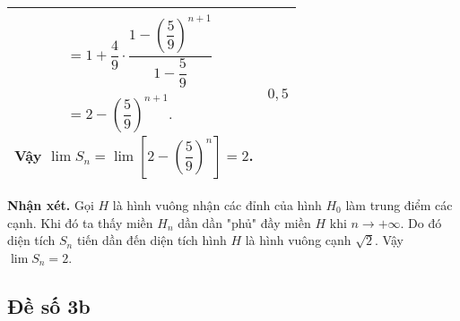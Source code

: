 \begin{bt}[$1{,}0$ điểm]
{\begin{longtable}{|p{13.5cm}|p{1.2cm}|}
\begin{minipage}{13.5cm}
$$\begin{aligned}
				&=1+\dfrac{4}{9}\cdot\dfrac{1-\left(\dfrac{5}{9}\right)^{n+1}}{1-\dfrac{5}{9}}\\
				&=2-\left(\dfrac{5}{9}\right)^{n+1}.
				\end{aligned}
				$$
				Vậy $\lim S_n=\lim \left[2-\left(\dfrac{5}{9}\right)^n\right]=2$.
			\end{minipage}& $0{,}5$\\
			\hline
		\end{longtable}
		\textbf{Nhận xét.} Gọi $H$ là hình vuông nhận các đỉnh của hình $H_0$ làm trung điểm các cạnh. Khi đó ta thấy miền $H_n$ dần dần "phủ" đầy miền $H$ khi $n\longrightarrow +\infty$. Do đó diện tích $S_n$ tiến dần đến diện tích hình $H$ là hình vuông cạnh $\sqrt{2}$. Vậy $\lim S_n=2$.
	}
\end{bt}


\subsection{Đề số 3b}
\setcounter{bt}{0}


